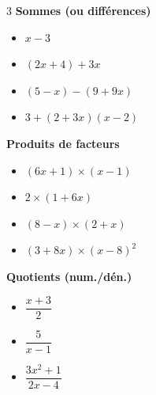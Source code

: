 \begin{ex}
	\nline
	\begin{multicols}{3}
		\textbf{Sommes (ou différences)}
		\begin{itemize}
			\item $x - 3$
			\item $(2x + 4) + 3x$
			\item $(5 - x) - (9 + 9x)$
			\item $3 + (2 + 3x)(x - 2)$
		\end{itemize}

		\columnbreak

		\textbf{Produits de facteurs}
		\begin{itemize}
			\item $(6x + 1) \times (x - 1)$
			\item $2 \times (1 + 6x)$
			\item $(8 - x) \times (2 + x)$
			\item $(3 + 8x) \times (x - 8)^2$
		\end{itemize}

		\columnbreak

		\textbf{Quotients (num./dén.)}
		\begin{itemize}
			\item $\dfrac{x+3}{2}$
			\item $\dfrac{5}{x-1}$
			\item $\dfrac{3x^2+1}{2x-4}$
		\end{itemize}
	\end{multicols}
\end{ex}

